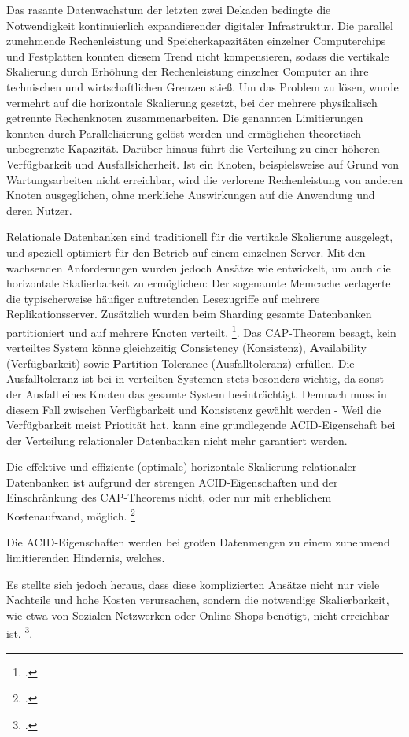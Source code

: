 Das rasante Datenwachstum der letzten zwei Dekaden bedingte die Notwendigkeit kontinuierlich expandierender digitaler Infrastruktur. Die parallel zunehmende Rechenleistung und Speicherkapazitäten einzelner Computerchips und Festplatten konnten diesem Trend nicht kompensieren, sodass die vertikale Skalierung durch Erhöhung der Rechenleistung einzelner Computer an ihre technischen und wirtschaftlichen Grenzen stieß. Um das Problem zu lösen, wurde vermehrt auf die horizontale Skalierung gesetzt, bei der mehrere physikalisch getrennte Rechenknoten zusammenarbeiten. Die genannten Limitierungen konnten durch Parallelisierung gelöst werden und ermöglichen theoretisch unbegrenzte Kapazität. Darüber hinaus führt die Verteilung zu einer höheren Verfügbarkeit und Ausfallsicherheit. Ist ein Knoten, beispielsweise auf Grund von Wartungsarbeiten nicht erreichbar, wird die verlorene Rechenleistung von anderen Knoten ausgeglichen, ohne merkliche Auswirkungen auf die Anwendung und deren Nutzer. 

Relationale Datenbanken sind traditionell für die vertikale Skalierung ausgelegt, und speziell optimiert für den Betrieb auf einem einzelnen Server. %
Mit den wachsenden Anforderungen wurden jedoch Ansätze wie entwickelt, um auch die horizontale Skalierbarkeit zu ermöglichen: Der sogenannte Memcache verlagerte die typischerweise häufiger auftretenden Lesezugriffe auf mehrere Replikationsserver. Zusätzlich wurden beim Sharding gesamte Datenbanken partitioniert und auf mehrere Knoten verteilt. \footcite[S. 16]{dertingerNoSQLDatenbankenUndNichtrelationale2025}. Das CAP-Theorem besagt, kein verteiltes System könne gleichzeitig \textbf{C}onsistency (Konsistenz), \textbf{A}vailability (Verfügbarkeit) sowie \textbf{P}artition Tolerance (Ausfalltoleranz) erfüllen. Die Ausfalltoleranz ist bei in verteilten Systemen stets besonders wichtig, da sonst der Ausfall eines Knoten das gesamte System beeinträchtigt. Demnach muss in diesem Fall zwischen Verfügbarkeit und Konsistenz gewählt werden - Weil die Verfügbarkeit meist Priotität hat, kann eine grundlegende ACID-Eigenschaft bei der Verteilung relationaler Datenbanken nicht mehr garantiert werden.




Die effektive und effiziente (optimale) horizontale Skalierung relationaler Datenbanken ist aufgrund der strengen ACID-Eigenschaften und der Einschränkung des CAP-Theorems nicht, oder nur mit erheblichem Kostenaufwand, möglich. \footcite[S. 1]{schreinerWhenRelationalBasedApplications2019} 

Die ACID-Eigenschaften werden bei großen Datenmengen zu einem zunehmend limitierenden Hindernis, welches.

Es stellte sich jedoch heraus, dass diese komplizierten Ansätze nicht nur viele Nachteile und hohe Kosten verursachen, sondern die notwendige Skalierbarkeit, wie etwa von Sozialen Netzwerken oder Online-Shops benötigt, nicht erreichbar ist. \footcite[S. 41-43]{harrisonNextGenerationDatabases2015}. 








